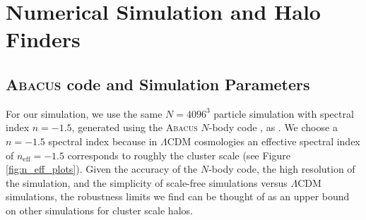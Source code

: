 \section{Numerical Simulation and Halo Finders}\label{sims_and_finders}
\subsection{\textsc{Abacus} code and Simulation 
Parameters}\label{Abacus}
For our simulation, we use the same $N=4096^3$ particle simulation with spectral index $n=-1.5$, generated using the \textsc{Abacus} $N$-body code \cite{Garrison_2021_ABACUS}, as \cite{Maleubre_2024}. We choose a $n=-1.5$ spectral index because in $\Lambda$CDM cosmologies an effective spectral index of $n_{\mathrm{eff}} = -1.5$ corresponds to roughly the cluster scale (see Figure \ref{fig:n_eff_plots}). Given the accuracy of the $N$-body code, the high resolution of the simulation, and the simplicity of scale-free simulations versus $\Lambda$CDM simulations, the robustness limits we find can be thought of as an upper bound on other simulations for cluster scale halos.


